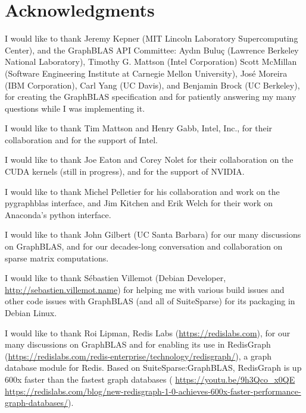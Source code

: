 \documentclass[12pt]{article}
\begin{document}
\section{Acknowledgments}

I would like to thank Jeremy Kepner (MIT Lincoln Laboratory Supercomputing
Center), and the GraphBLAS API Committee: Ayd\i n Bulu\c{c} (Lawrence Berkeley
National Laboratory), Timothy G. Mattson (Intel Corporation) Scott McMillan
(Software Engineering Institute at Carnegie Mellon University), Jos\'e Moreira
(IBM Corporation), Carl Yang (UC Davis), and Benjamin Brock (UC Berkeley), for
creating the GraphBLAS specification and for patiently answering my many
questions while I was implementing it.

I would like to thank Tim Mattson and Henry Gabb, Intel, Inc., for their
collaboration and for the support of Intel.

I would like to thank Joe Eaton and Corey Nolet for their collaboration on the
CUDA kernels (still in progress), and for the support of NVIDIA.

I would like to thank Michel Pelletier for his collaboration and work on the
pygraphblas interface, and Jim Kitchen and Erik Welch for their work on
Anaconda's python interface.

I would like to thank John Gilbert (UC Santa Barbara) for our many discussions
on GraphBLAS, and for our decades-long conversation and collaboration on sparse
matrix computations.

I would like to thank S\'ebastien Villemot (Debian Developer,
\url{http://sebastien.villemot.name}) for helping me with various build issues
and other code issues with GraphBLAS (and all of SuiteSparse) for its packaging
in Debian Linux.

I would like to thank Roi Lipman, Redis Labs (\url{https://redislabs.com}), for
our many discussions on GraphBLAS and for enabling its use in RedisGraph
(\url{https://redislabs.com/redis-enterprise/technology/redisgraph/}), a graph
database module for Redis.  Based on SuiteSparse:GraphBLAS, RedisGraph is up
600x faster than the fastest graph databases ({\footnotesize
\url{https://youtu.be/9h3Qco_x0QE} \newline
\url{https://redislabs.com/blog/new-redisgraph-1-0-achieves-600x-faster-performance-graph-databases/}}).
\end{document}
